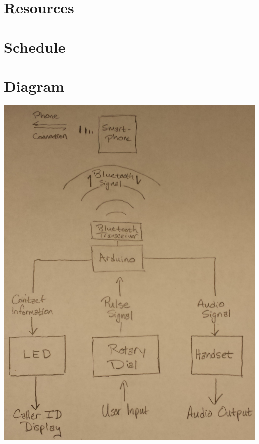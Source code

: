 \documentclass[11pt]{article}
\begin{document}
    \section{Resources}


    \section{Schedule}


    \section{Diagram}
        \includegraphics[width=\linewidth,angle=270]{blockdiagram}
\end{document}
